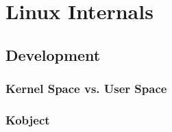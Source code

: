 \chapter{Linux Internals}

\section{Development}

\subsection{Kernel Space vs. User Space}

\subsection{Kobject}
